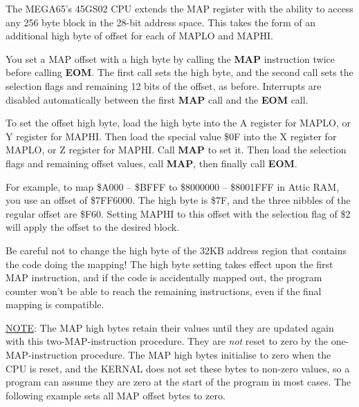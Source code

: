 The MEGA65's 45GS02 CPU extends the MAP register with the ability to access any 256 byte block in the 28-bit address space. This takes the form of an additional high byte of offset for each of MAPLO and MAPHI.

You set a MAP offset with a high byte by calling the {\bf MAP} instruction twice before calling {\bf EOM}. The first call sets the high byte, and the second call sets the selection flags and remaining 12 bits of the offset, as before. Interrupts are disabled automatically between the first {\bf MAP} call and the {\bf EOM} call.

To set the offset high byte, load the high byte into the A register for MAPLO, or Y register for MAPHI. Then load the special value \$0F into the X register for MAPLO, or Z register for MAPHI. Call {\bf MAP} to set it. Then load the selection flags and remaining offset values, call {\bf MAP}, then finally call {\bf EOM}.

For example, to map \$A000 -- \$BFFF to \$8000000 -- \$8001FFF in Attic RAM, you use an offset of \$7FF6000. The high byte is \$7F, and the three nibbles of the regular offset are \$F60. Setting MAPHI to this offset with the selection flag of \$2 will apply the offset to the desired block.


Be careful not to change the high byte of the 32KB address region that contains the code doing the mapping! The high byte setting takes effect upon the first MAP instruction, and if the code is accidentally mapped out, the program counter won't be able to reach the remaining instructions, even if the final mapping is compatible.

\underline{NOTE}: The MAP high bytes retain their values until they are updated again with this two-MAP-instruction procedure. They are \emph{not} reset to zero by the one-MAP-instruction procedure. The MAP high bytes initialise to zero when the CPU is reset, and the KERNAL does not set these bytes to non-zero values, so a program can assume they are zero at the start of the program in most cases. The following example sets all MAP offset bytes to zero.

